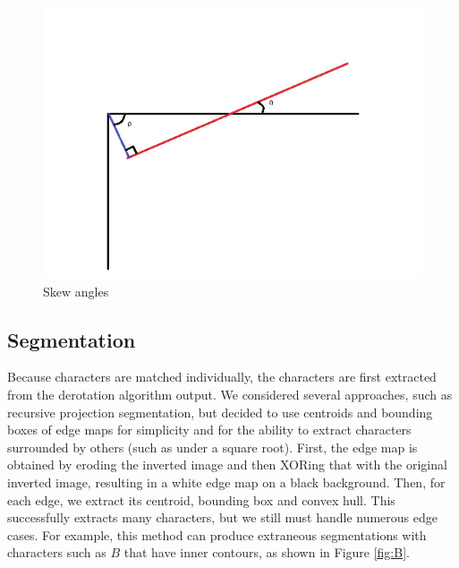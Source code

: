 \documentclass[journal]{IEEEtran}
\begin{document}
 
 
\begin{figure}[!t]
    \centering
    \includegraphics[width=\columnwidth]{fig3}
    \caption{Skew angles}
    \label{fig:3}
\end{figure}
 
\subsection{Segmentation}
Because characters are matched individually, the characters are first extracted from the derotation algorithm output. We considered several approaches, such as recursive projection segmentation\cite{Naqvi:article_typical}, but decided to use centroids and bounding boxes of edge maps for simplicity and for the ability to extract characters surrounded by others (such as under a square root).
First, the edge map is obtained by eroding the inverted image and then XORing that with the original inverted image, resulting in a white edge map on a black background. Then, for each edge, we extract its centroid, bounding box and convex hull. This successfully extracts many characters, but we still must handle numerous edge cases. For example, this method can produce extraneous segmentations with characters such as $B$ that have inner contours, as shown in Figure \ref{fig:B}.
\end{document}
